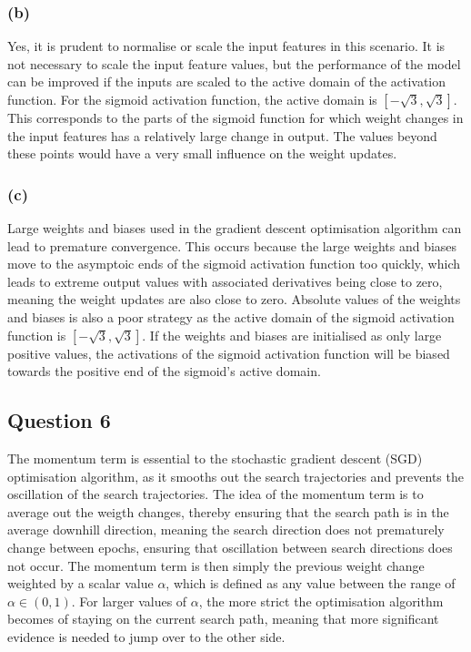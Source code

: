 \documentclass[10pt]{article}
\begin{document}
\subsubsection*{(b)}

Yes, it is prudent to normalise or scale the input features in this scenario. It is not necessary to scale the input
feature values, but the performance of the model can be improved if the inputs are scaled to the active domain of the
activation function. For the sigmoid activation function, the active domain is $[-\sqrt{3}, \sqrt{3}]$. This corresponds
to the parts of the sigmoid function for which weight changes in the input features has a relatively large change
in output. The values beyond these points would have a very small influence on the weight updates.

\subsubsection*{(c)}

Large weights and biases used in the gradient descent optimisation algorithm can lead to premature convergence.
This occurs because the large weights and biases move to the asymptoic ends of the sigmoid activation function too quickly,
which leads to extreme output values with associated derivatives being close to zero, meaning the weight updates are
also close to zero. Absolute values of the weights and biases is also a poor strategy as the active domain of the sigmoid
activation function is $[-\sqrt{3}, \sqrt{3}]$. If the weights and biases are initialised as only large positive values,
the activations of the sigmoid activation function will be biased towards the positive end of the sigmoid's active domain.

\subsection*{Question 6}

The momentum term is essential to the stochastic gradient descent (SGD) optimisation algorithm, as it smooths
out the search trajectories and prevents the oscillation of the search trajectories. The idea of the momentum
term is to average out the weigth changes, thereby ensuring that the search path is in the average downhill
direction, meaning the search direction does not prematurely change between epochs, ensuring that oscillation
between search directions does not occur. The momentum term is then simply the previous weight change weighted
by a scalar value $\alpha$, which is defined as any value between the range of $\alpha \in (0,1)$.
For larger values of $\alpha$, the more strict the optimisation algorithm becomes of staying on the current search
path, meaning that more significant evidence is needed to jump over to the other side.
\end{document}
